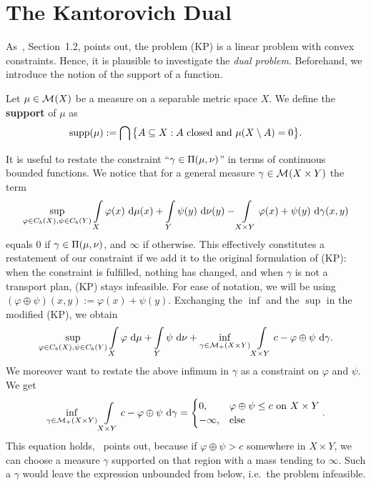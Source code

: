 \section{The Kantorovich Dual}\label{KanDual}

As~\cite{San2015}, Section~1.2, points out, the problem (KP) is a linear problem with convex constraints. Hence, it is plausible to investigate the \textit{dual problem}. Beforehand, we introduce the notion of the support of a function.

\begin{definition}\label{Supp}
	Let $\mu \in \M{X}$ be a measure on a separable metric space $X$. We define the \textbf{support} of $\mu$ as
	\[ \supp{\mu} := \bigcap \big\{ A \subseteq X : A \text{ closed and } \mu(X \setminus A) = 0 \big\}. \]
\end{definition}

It is useful to restate the constraint ``$\gamma \in \TP{\mu}{\nu}$'' in terms of continuous bounded functions. We notice that for a general measure $\gamma \in \M{X \times Y}$ the term
\[ \sup\limits_{\varphi \in \CF[b]{X}, \psi \in \CF[b]{Y}} \int\limits_X \varphi(x)~\Dx{\mu} + \int\limits_Y \psi(y)~\Dx[y]{\nu} - \int\limits_{X \times Y} \varphi(x) + \psi(y)~\Dx[x, y]{\gamma} \]
equals $0$ if $\gamma \in \TP{\mu}{\nu}$, and $\infty$ if otherwise. This effectively constitutes a restatement of our constraint if we add it to the original formulation of (KP): when the constraint is fulfilled, nothing has changed, and when $\gamma$ is not a transport plan, (KP) stays infeasible. For ease of notation, we will be using $(\varphi \oplus \psi)(x, y) := \varphi(x) + \psi(y)$. Exchanging the $\inf$ and the $\sup$ in the modified (KP), we obtain
\[ \sup\limits_{\varphi \in \CF[b]{X}, \psi \in \CF[b]{Y}} \int\limits_{X} \varphi~\D + \int\limits_{Y} \psi~\D[\nu] + \inf\limits_{\gamma \in \M[+]{X \times Y}} \int\limits_{X \times Y} c - \varphi \oplus \psi~\D[\gamma]. \]
We moreover want to restate the above infimum in $\gamma$ as a constraint on $\varphi$ and $\psi$. We get
\[ \inf\limits_{\gamma \in \M[+]{X \times Y}} \int\limits_{X \times Y} c - \varphi \oplus \psi~\D[\gamma] = 
\begin{cases}
	0, & \varphi \oplus \psi \le c \text{ on } X \times Y \\
	- \infty, & \text{else}
\end{cases}. \]
This equation holds,\ \cite{San2015} points out, because if $\varphi \oplus \psi > c$ somewhere in $X \times Y$, we can choose a measure $\gamma$ supported on that region with a mass tending to $\infty$. Such a $\gamma$ would leave the expression unbounded from below, i.e.\ the problem infeasible.

